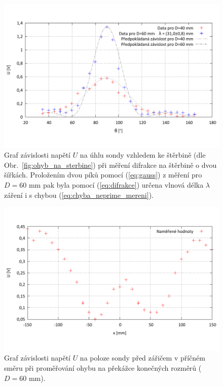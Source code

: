 \documentclass[english]{article}
\begin{document}
	\begin{figure}[h!]
	\begin{center}
	    \vspace*{-1cm}
		\includegraphics[width=\linewidth]{../gnuplot/4_difrakce.pdf}
	    \vspace*{-2cm}
		\caption{Graf závislosti napětí $U$ na úhlu sondy vzhledem ke štěrbině (dle Obr.~\ref{fig:ohyb_na_sterbine}) při měření difrakce na štěrbině o dvou šířkách. Proložením dvou píků pomocí (\ref{eq:gauss}) z měření pro $D=60$ mm pak byla pomocí (\ref{eq:difrakce}) určena vlnová délka $\lambda$ záření i s chybou (\ref{eq:chyba_neprime_mereni}). }
		\label{fig:g_difrakce}
	\end{center}
	\end{figure}
	
	\begin{figure}[h!]
	\begin{center}
	    \vspace*{-1cm}
		\includegraphics[width=\linewidth]{../gnuplot/4_prekazka.pdf}
	    \vspace*{-2cm}
		\caption{Graf závislosti napětí $U$ na poloze sondy před zářičem v příčném směru při proměřování ohybu na překážce konečných rozměrů ($D=60$ mm). }
		\label{fig:g_prekazka}
	\end{center}
	\end{figure}			
	
\end{document}
